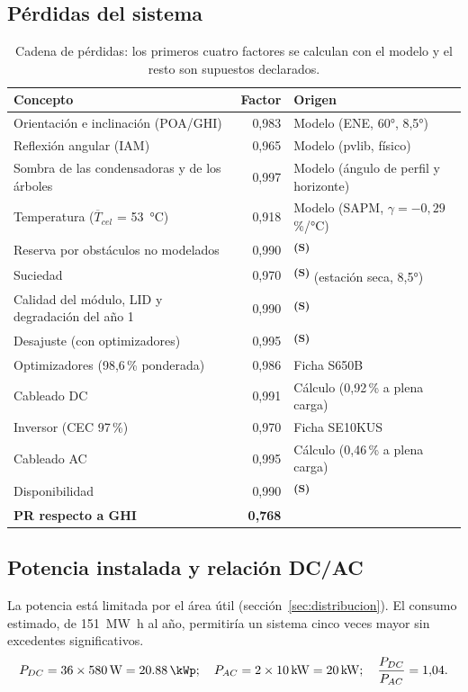 \documentclass[12pt]{article}
\newcommand{\supuesto}{\textsuperscript{\textcolor{orange!80!black}{\textbf{(S)}}}}
\begin{document}
\subsection{Pérdidas del sistema}
\begin{table}[H]
\centering\small
\caption{Cadena de pérdidas: los primeros cuatro factores se calculan con el modelo y el resto son supuestos declarados.}\label{tab:perdidas}
\begin{tabularx}{\linewidth}{Xrl}
\toprule
\textbf{Concepto} & \textbf{Factor} & \textbf{Origen}\\
\midrule
Orientación e inclinación (POA/GHI) & 0,983 & Modelo (ENE, 60°, 8,5°)\\
Reflexión angular (IAM) & 0,965 & Modelo (pvlib, físico)\\
Sombra de las condensadoras y de los árboles & 0,997 & Modelo (ángulo de perfil y horizonte)\\
Temperatura ($\overline{T}_{cel}$ = 53~°C) & 0,918 & Modelo (SAPM, $\gamma=-0{,}29$\,\%/°C)\\
Reserva por obstáculos no modelados & 0,990 & \supuesto{}\\
Suciedad & 0,970 & \supuesto{} (estación seca, 8,5°)\\
Calidad del módulo, LID y degradación del año 1 & 0,990 & \supuesto{}\\
Desajuste (con optimizadores) & 0,995 & \supuesto{}\\
Optimizadores (98,6\,\% ponderada) & 0,986 & Ficha S650B\\
Cableado DC & 0,991 & Cálculo (0,92\,\% a plena carga)\\
Inversor (CEC 97\,\%) & 0,970 & Ficha SE10KUS\\
Cableado AC & 0,995 & Cálculo (0,46\,\% a plena carga)\\
Disponibilidad & 0,990 & \supuesto{}\\
\midrule
\textbf{PR respecto a GHI} & \textbf{0,768} & \\
\bottomrule
\end{tabularx}
\end{table}

\subsection{Potencia instalada y relación DC/AC}
La potencia está limitada por el área útil (sección~\ref{sec:distribucion}). El consumo estimado, de \SI{151}{\mega\watt\hour} al año, permitiría un sistema cinco veces mayor sin excedentes significativos.
\begin{equation}
P_{DC}=36\times\SI{580}{\watt}=\SI{20.88}{\kWp};\quad P_{AC}=2\times\SI{10}{\kilo\watt}=\SI{20}{\kilo\watt};\quad \frac{P_{DC}}{P_{AC}}=1{,}04.
\end{equation}
\end{document}
